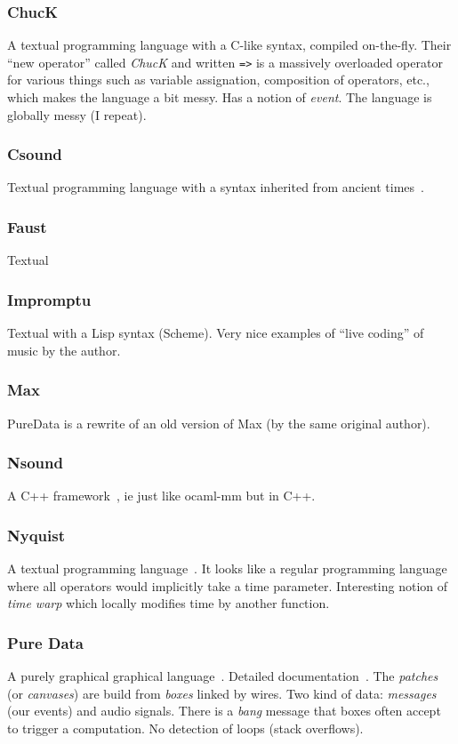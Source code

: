 \documentclass[a4paper,titlepage]{article}
\begin{document}
\subsubsection{ChucK}
A textual programming language with a C-like syntax, compiled
on-the-fly\cite{chuck}. Their ``new operator'' called \emph{ChucK} and written
\texttt{=>} is a massively overloaded operator for various things such as
variable assignation, composition of operators, etc., which makes the language a
bit messy. Has a notion of \emph{event}. The language is globally messy (I
repeat).

\subsubsection{Csound}
Textual programming language with a syntax inherited from ancient
times~\cite{csound}.

\subsubsection{Faust}
\cite{faust}
Textual

\subsubsection{Impromptu}
\cite{impromptu} Textual with a Lisp syntax (Scheme). Very nice examples of ``live
coding'' of music by the author.

\subsubsection{Max}
\cite{max}
PureData is a rewrite of an old version of Max (by the same original author).

\subsubsection{Nsound}
A C++ framework~\cite{nsound}, ie just like ocaml-mm but in C++.

\subsubsection{Nyquist}
A textual programming language~\cite{nyquist}. It looks like a regular
programming language where all operators would implicitly take a time
parameter. Interesting notion of \emph{time warp} which locally modifies time by
another function.


\subsubsection{Pure Data}
A purely graphical graphical language~\cite{puredata}. Detailed
documentation~\cite{pd-doc}. The \emph{patches} (or \emph{canvases}) are build
from \emph{boxes} linked by wires. Two kind of data: \emph{messages} (our
events) and audio signals. There is a \emph{bang} message that boxes often
accept to trigger a computation. No detection of loops (stack overflows).
\end{document}
